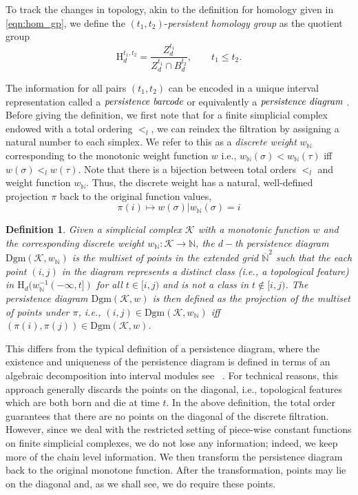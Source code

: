 \documentclass[12pt]{amsart}
\newtheorem{definition}[theorem]{Definition}
\numberwithin{equation}{section}
\numberwithin{theorem}{section}
\newcommand{\Dgm}{\mathrm{Dgm}}
\newcommand{\discrete}{\mathbb{N}}
\newcommand{\Hg}{\mathrm{H}}
\newcommand{\1}{\mathbf{1}}
\def\K{\mathcal{K}}
\begin{document}
To track the changes in topology, akin to the definition for homology given in \eqref{eqn:hom_gp}, we define the $(t_1, t_2)$-\emph{persistent homology group} as the quotient group
$$
\Hg_d^{t_1,t_2} = \frac{Z_d^{t_1}}{Z_d^{t_1}\cap B_d^{t_2}}, \qquad t_1 \leq t_2.
$$

The information for all pairs $(t_1, t_2)$ can be encoded in a unique interval representation called a $\emph{persistence barcode}$ \cite{zomorodian2005computing} or equivalently a $\emph{persistence diagram}$ \cite{cohen2007stability}. Before giving the definition, we first note that for a finite simplicial complex endowed with a total ordering $<_l$, we can reindex the filtration by assigning a natural number to each simplex. We refer to this as a \emph{discrete weight} $w_\discrete$ corresponding to the monotonic weight function $w$ i.e., $w_\discrete (\sigma) < w_\discrete (\tau)$ iff $w(\sigma) <_l  w(\tau)$. Note that there is a bijection between total orders $<_l$ and weight function $w_\discrete$. Thus, the discrete weight has a natural, well-defined projection $\pi$ back to the original function values,
$$ \pi(i)  \mapsto w(\sigma) | w_\discrete(\sigma) = i $$
%
\begin{definition}
\label{def:pd}
Given a simplicial complex $\K$ with a monotonic function $w$ and the corresponding discrete weight $w_\discrete: \K \rightarrow \mathbb{N}$,  the $d-$th persistence diagram $\Dgm(\K, w_\discrete)$ is the multiset of points in the extended grid $\overline{\mathbb{N}}^2 $ such that the each point $(i, j)$ in the diagram represents a distinct class (i.e., a topological feature) in $ \Hg_d(w_\discrete^{-1}(-\infty,t])$ for all $t \in[i, j)$ and is not a class in $t \notin [i, j)$. The persistence diagram $\Dgm(\K, w)$ is then defined as the projection of the multiset of points under $\pi$, i.e., $(i,j)\in \Dgm(\K, w_\discrete)$ iff  $(\pi(i),\pi(j)) \in \Dgm(\K,w)$.
\end{definition}

This differs from the typical definition of a persistence diagram, where the existence and uniqueness of the persistence diagram  is defined in terms of an algebraic decomposition into interval modules see ~\cite{chazal2012structure,crawley2015decomposition}. For technical reasons, this approach generally discards the points on the diagonal, i.e., topological features which are both born and die at time $t$.  In the above definition, the total order guarantees that there are no points on the diagonal of the discrete filtration. However, since we deal with the restricted setting of piece-wise constant functions on finite simplicial complexes, we do not lose any information; indeed, we keep more of the chain level information. We then transform the persistence diagram back to the original monotone function.  After  the transformation, points may lie on the diagonal and, as we shall see, we do require these points.
\end{document}
